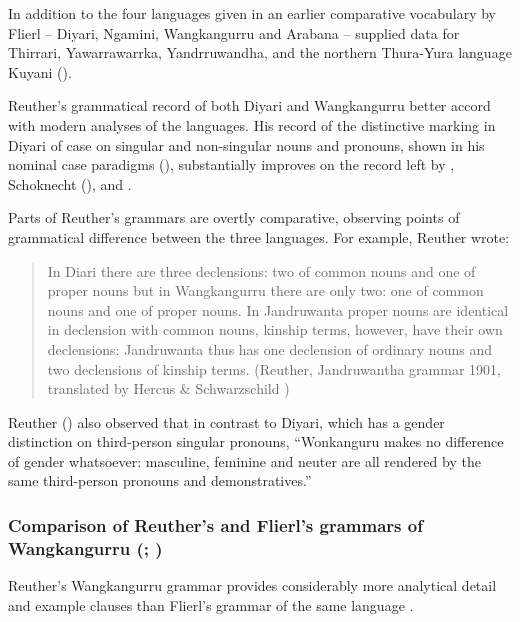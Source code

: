 In addition to the four languages given in an earlier comparative vocabulary by Flierl \citeyearpar{flierl_comparative_nodate} – Diyari, Ngamini, Wangkangurru and Arabana – \citet{reuther_ms_1899} supplied data for Thirrari, Yawarrawarrka, Yandrruwandha, and the northern Thura-Yura language Kuyani ().

Reuther’s grammatical record of both Diyari and Wangkangurru better accord with modern analyses of the languages. His record of the distinctive marking in Diyari of case on singular and non-singular nouns and pronouns, shown in his nominal case paradigms (), substantially improves on the record left by \citet{flierl_christianieli_1880}, Schoknecht (\citeyear{schoknecht_grammar_1947}), and \citet{koch_untitled_1868}.

\hspace*{-2.3pt}Parts of Reuther’s grammars are overtly comparative, observing points of grammatical difference between the three languages. For example, Reuther wrote:

\begin{quote}
In Diari there are three declensions: two of common nouns and one of proper nouns but in Wangkangurru there are only two: one of common nouns and one of proper nouns. In Jandruwanta proper nouns are identical in declension with common nouns, kinship terms, however, have their own declensions: Jandruwanta thus has one declension of ordinary nouns and two declensions of kinship terms. (Reuther, Jandruwantha grammar 1901, translated by Hercus \& Schwarzschild \citeyear[56]{Hercus_Schwarzschild1981})
\end{quote}


Reuther (\citeyear[38]{Hercus_Schwarzschild1981}) also observed that in contrast to Diyari, which has a gender distinction on third-person singular pronouns, “Wonkanguru makes no difference of gender whatsoever: masculine, feminine and neuter are all rendered by the same third-person pronouns and demonstratives.”

\subsubsection{Comparison of Reuther’s and Flierl’s grammars of Wangkangurru (\citeyear{reuther_repr_1899}; \citeyear{flierl_dieri_1880})}
\label{sec:key:8.4.2.2}\label{bkm:Ref466972983}

Reuther’s Wangkangurru grammar \citeyearpar{reuther_repr_1899} provides considerably more analytical detail and example clauses than Flierl’s grammar of the same language \citeyearpar{flierl_dieri_1880}.

